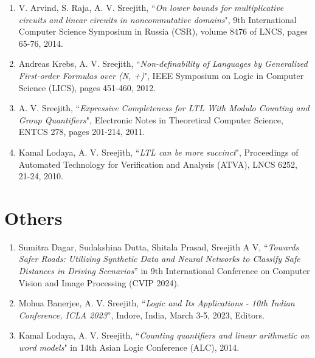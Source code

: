 \documentclass[margin]{res}
\begin{document}
\begin{resume}
\begin{enumerate}
\item V. Arvind, S. Raja, A. V. Sreejith, ``\emph{On lower bounds for multiplicative circuits and linear circuits in noncommutative domains}", 9th International Computer Science Symposium in Russia (CSR), volume 8476 of LNCS, pages 65-76, 2014.
\item Andreas Krebs, A. V. Sreejith, ``\emph{Non-definability of Languages by Generalized First-order Formulas over (N, +)}", IEEE Symposium on Logic in Computer Science (LICS),  pages 451-460, 2012.
\item A. V. Sreejith, ``\emph{Expressive Completeness for LTL With Modulo Counting and Group Quantifiers}", Electronic Notes in Theoretical Computer Science, ENTCS 278, pages 201-214, 2011.
\item Kamal Lodaya, A. V. Sreejith, ``\emph{LTL can be more succinct}", Proceedings of Automated Technology for Verification and Analysis (ATVA), LNCS 6252, 21-24, 2010.
\end{enumerate}

\section{Others}
\begin{enumerate}
\item Sumitra Dagar, Sudakshina Dutta, Shitala Prasad, Sreejith A V, ``\emph{Towards Safer Roads: Utilizing Synthetic Data and Neural Networks to Classify Safe Distances in Driving Scenarios}'' in 9th International Conference on Computer Vision and Image Processing (CVIP 2024).
\item Mohua Banerjee, A. V. Sreejith, ``\emph{Logic and Its Applications - 10th Indian Conference, ICLA 2023}'', Indore, India, March 3-5, 2023, Editors.
\item Kamal Lodaya, A. V. Sreejith, ``\emph{Counting quantifiers and linear arithmetic on word models}" in 14th Asian Logic Conference (ALC), 2014.
\end{enumerate}



\end{resume}
\end{document}
